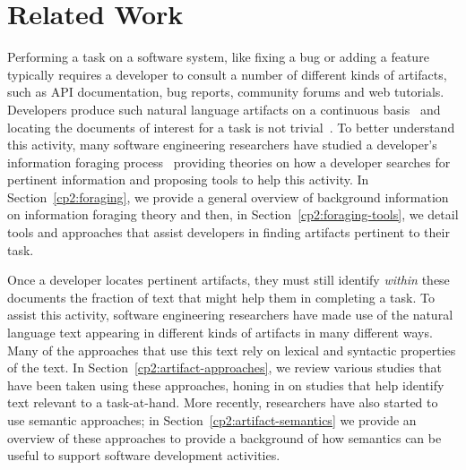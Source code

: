 \setcounter{chapter}{1}


\chapter{Related Work}
\label{ch:related-work}








Performing a task on a software system, like fixing a bug
or adding a feature typically requires a developer to consult
a number of different kinds of artifacts, such
as API documentation, bug reports, community forums
and web tutorials. 
Developers produce such natural language artifacts on a 
continuous basis~\cite{Rastkar2013t} 
and locating the documents of interest for a task
is not trivial~\cite{Starke2009}. 
To better understand this activity, 
many software engineering researchers 
have studied  a developer's information foraging process~\cite{Pirolli1999}
providing theories on how a developer searches for pertinent information
and proposing tools to help this activity.
In Section~\ref{cp2:foraging},
we provide a general overview of background information on 
information foraging theory and 
then, in Section~\ref{cp2:foraging-tools}, we detail tools and approaches that assist developers in finding artifacts pertinent to their task.



Once a developer locates pertinent artifacts, 
they must still identify \textit{within} these documents 
the fraction of text that might help them in completing a task.
To assist this activity, software engineering researchers have made use of the natural language text appearing in different kinds of artifacts in many different ways.
Many of the approaches that
use this text rely on lexical and syntactic properties of the text. 
In Section~\ref{cp2:artifact-approaches}, we review various studies that have been taken using these approaches,
honing in on studies that help identify text relevant to a task-at-hand.
More recently, researchers have also started to use semantic approaches; 
in Section~\ref{cp2:artifact-semantics} we 
provide an overview of these approaches to provide a background of
how semantics can be useful to support software development activities.








